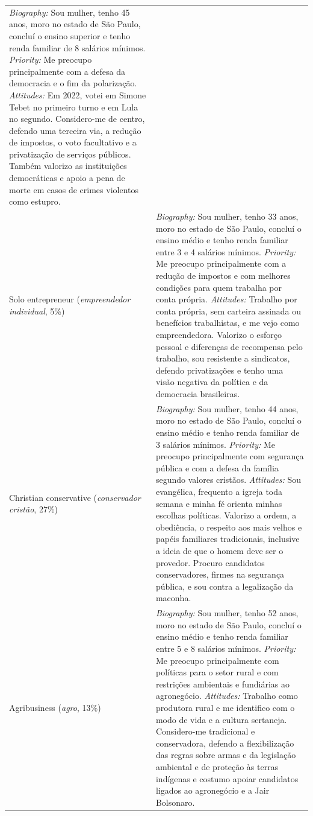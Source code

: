 \documentclass[11pt]{article}
\begin{document}
\begin{longtable}{@{}p{2.6cm}p{12.4cm}@{}}
\emph{Biography:} Sou mulher, tenho 45 anos, moro no estado de São Paulo, concluí o ensino superior e tenho renda familiar de 8 salários mínimos.
\emph{Priority:} Me preocupo principalmente com a defesa da democracia e o fim da polarização.
\emph{Attitudes:} Em 2022, votei em Simone Tebet no primeiro turno e em Lula no segundo. Considero-me de centro, defendo uma terceira via, a redução de impostos, o voto facultativo e a privatização de serviços públicos. Também valorizo as instituições democráticas e apoio a pena de morte em casos de crimes violentos como estupro. \\
\addlinespace
Solo entrepreneur \newline (\emph{empreendedor individual}, 5\%) &
\emph{Biography:} Sou mulher, tenho 33 anos, moro no estado de São Paulo, concluí o ensino médio e tenho renda familiar entre 3 e 4 salários mínimos.
\emph{Priority:} Me preocupo principalmente com a redução de impostos e com melhores condições para quem trabalha por conta própria.
\emph{Attitudes:} Trabalho por conta própria, sem carteira assinada ou benefícios trabalhistas, e me vejo como empreendedora. Valorizo o esforço pessoal e diferenças de recompensa pelo trabalho, sou resistente a sindicatos, defendo privatizações e tenho uma visão negativa da política e da democracia brasileiras. \\
\addlinespace
Christian conservative \newline (\emph{conservador cristão}, 27\%) &
\emph{Biography:} Sou mulher, tenho 44 anos, moro no estado de São Paulo, concluí o ensino médio e tenho renda familiar de 3 salários mínimos.
\emph{Priority:} Me preocupo principalmente com segurança pública e com a defesa da família segundo valores cristãos.
\emph{Attitudes:} Sou evangélica, frequento a igreja toda semana e minha fé orienta minhas escolhas políticas. Valorizo a ordem, a obediência, o respeito aos mais velhos e papéis familiares tradicionais, inclusive a ideia de que o homem deve ser o provedor. Procuro candidatos conservadores, firmes na segurança pública, e sou contra a legalização da maconha. \\
\addlinespace
Agribusiness \newline (\emph{agro}, 13\%) &
\emph{Biography:} Sou mulher, tenho 52 anos, moro no estado de São Paulo, concluí o ensino médio e tenho renda familiar entre 5 e 8 salários mínimos.
\emph{Priority:} Me preocupo principalmente com políticas para o setor rural e com restrições ambientais e fundiárias ao agronegócio.
\emph{Attitudes:} Trabalho como produtora rural e me identifico com o modo de vida e a cultura sertaneja. Considero-me tradicional e conservadora, defendo a flexibilização das regras sobre armas e da legislação ambiental e de proteção às terras indígenas e costumo apoiar candidatos ligados ao agronegócio e a Jair Bolsonaro. \\

\end{longtable}
\end{document}
